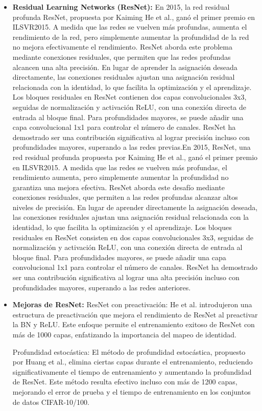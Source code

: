 \begin{itemize}
  \item \textbf{Residual Learning Networks (ResNet):} En 2015, la red residual profunda ResNet, propuesta por Kaiming He et al., ganó el primer premio en ILSVR2015. A medida que las redes se vuelven más profundas, aumenta el rendimiento de la red, pero simplemente aumentar la profundidad de la red no mejora efectivamente el rendimiento. ResNet aborda este problema mediante conexiones residuales, que permiten que las redes profundas alcancen una alta precisión. En lugar de aprender la asignación deseada directamente, las conexiones residuales ajustan una asignación residual relacionada con la identidad, lo que facilita la optimización y el aprendizaje. Los bloques residuales en ResNet contienen dos capas convolucionales 3x3, seguidas de normalización y activación ReLU, con una conexión directa de entrada al bloque final. Para profundidades mayores, se puede añadir una capa convolucional 1x1 para controlar el número de canales. ResNet ha demostrado ser una contribución significativa al lograr precisión incluso con profundidades mayores, superando a las redes previas.En 2015, ResNet, una red residual profunda propuesta por Kaiming He et al., ganó el primer premio en ILSVR2015. A medida que las redes se vuelven más profundas, el rendimiento aumenta, pero simplemente aumentar la profundidad no garantiza una mejora efectiva. ResNet aborda este desafío mediante conexiones residuales, que permiten a las redes profundas alcanzar altos niveles de precisión. En lugar de aprender directamente la asignación deseada, las conexiones residuales ajustan una asignación residual relacionada con la identidad, lo que facilita la optimización y el aprendizaje. Los bloques residuales en ResNet consisten en dos capas convolucionales 3x3, seguidas de normalización y activación ReLU, con una conexión directa de entrada al bloque final. Para profundidades mayores, se puede añadir una capa convolucional 1x1 para controlar el número de canales. ResNet ha demostrado ser una contribución significativa al lograr una alta precisión incluso con profundidades mayores, superando a las redes anteriores.
  
  \item \textbf{Mejoras de ResNet:}
 ResNet con preactivación: He et al. introdujeron una estructura de preactivación que mejora el rendimiento de ResNet al preactivar la BN y ReLU. Este enfoque permite el entrenamiento exitoso de ResNet con más de 1000 capas, enfatizando la importancia del mapeo de identidad.
 
 Profundidad estocástica: El método de profundidad estocástica, propuesto por Huang et al., elimina ciertas capas durante el entrenamiento, reduciendo significativamente el tiempo de entrenamiento y aumentando la profundidad de ResNet. Este método resulta efectivo incluso con más de 1200 capas, mejorando el error de prueba y el tiempo de entrenamiento en los conjuntos de datos CIFAR-10/100.
 

\end{itemize}
